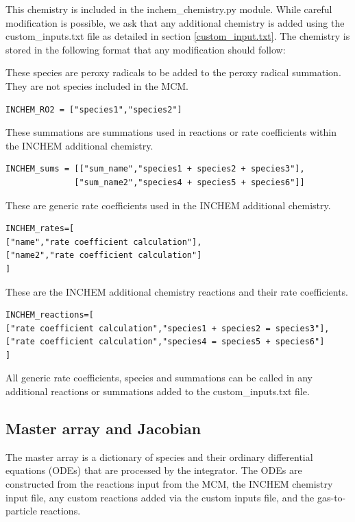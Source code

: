\documentclass[a4paper]{refart}
\begin{document}
This chemistry is included in the inchem\_chemistry.py module. While careful modification is possible, we ask that any additional chemistry is added using the custom\_inputs.txt file as detailed in section \ref{custom_input.txt}. The chemistry is stored in the following format that any modification should follow:

These species are peroxy radicals to be added to the peroxy radical summation. They are not species included in the MCM.
\begin{verbatim}
INCHEM_RO2 = ["species1","species2"]
\end{verbatim}

These summations are summations used in reactions or rate coefficients within the INCHEM additional chemistry.
\begin{verbatim}
INCHEM_sums = [["sum_name","species1 + species2 + species3"],
              ["sum_name2","species4 + species5 + species6"]]
\end{verbatim}

These are generic rate coefficients used in the INCHEM additional chemistry.
\begin{verbatim}
INCHEM_rates=[
["name","rate coefficient calculation"],
["name2","rate coefficient calculation"]
]
\end{verbatim}

These are the INCHEM additional chemistry reactions and their rate coefficients.
\begin{verbatim}
INCHEM_reactions=[
["rate coefficient calculation","species1 + species2 = species3"],
["rate coefficient calculation","species4 = species5 + species6"]
]
\end{verbatim}

All generic rate coefficients, species and summations can be called in any additional reactions or summations added to the custom\_inputs.txt file.

\subsection{Master array and Jacobian}
\label{master array}
The master array is a dictionary of species and their ordinary differential equations (ODEs) that are processed by the integrator. The ODEs are constructed from the reactions input from the MCM, the INCHEM chemistry input file, any custom reactions added via the custom inputs file, and the gas-to-particle reactions. 
\end{document}

